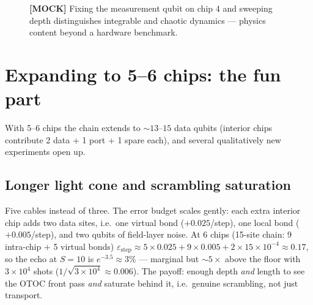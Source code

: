 \documentclass[11pt]{article}
\begin{document}
\begin{figure}[h]
\centering
{}
\caption{\textbf{[MOCK]} Fixing the measurement qubit on chip 4 and sweeping
depth distinguishes integrable and chaotic dynamics --- physics content beyond
a hardware benchmark.}
\label{fig:chaos}
\end{figure}

\section{Expanding to 5--6 chips: the fun part}

With 5--6 chips the chain extends to ${\sim}13$--$15$ data qubits
(interior chips contribute 2 data + 1 port + 1 spare each), and several
qualitatively new experiments open up.

\subsection{Longer light cone and scrambling saturation}
Five cables instead of three. The error budget scales gently: each extra
interior chip adds two data sites, i.e.\ one virtual bond ($+0.025$/step),
one local bond ($+0.005$/step), and two qubits of field-layer noise. At 6
chips (15-site chain: 9 intra-chip $+$ 5 virtual bonds)
$\varepsilon_{\mathrm{step}} \approx 5\times0.025 + 9\times0.005 +
2\times15\times10^{-4} \approx 0.17$, so the echo at $S=10$ is
$e^{-3.5}\approx 3\%$ --- marginal but ${\sim}5\times$ above the floor with
$3\times10^4$ shots ($1/\sqrt{3\times10^4}\approx0.006$). The payoff: enough
depth \emph{and} length to see the OTOC front pass \emph{and} saturate
behind it, i.e.\ genuine scrambling, not just transport.
\end{document}
